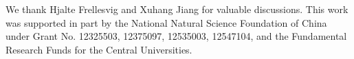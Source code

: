 \documentclass[reprint,superscriptaddress]{revtex4-2}
\begin{document}
\begin{acknowledgments}
We thank Hjalte Frellesvig and Xuhang Jiang for valuable discussions. This work was supported in part by the National Natural Science Foundation of China under Grant No. 12325503, 12375097, 12535003, 12547104, and the Fundamental Research Funds for the Central Universities.
\end{acknowledgments}




\end{document}

